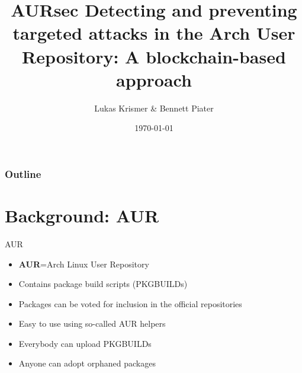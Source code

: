\documentclass{beamer}
\title{AURsec \newline Detecting and preventing targeted attacks in the Arch User Repository: A blockchain-based approach}
\author{Lukas Krismer \& Bennett Piater}
\institute{Universität Innsbruck - QE - Christian Sillaber}
\date{\today}
\begin{document}
\maketitle


\begin{frame}
	\frametitle{Outline}
	\tableofcontents
\end{frame}




\section{Background: AUR}

\begin{frame}{AUR}
	\pause
	\begin{itemize}
		\item \textbf{AUR}=\alert{A}rch Linux \alert{U}ser \alert{R}epository
		\item Contains package build scripts (PKGBUILDs)
		\item Packages can be voted for inclusion in the official repositories
		\item Easy to use using so-called AUR helpers
		\item Everybody can upload PKGBUILDs
		\item Anyone can adopt orphaned packages
	\end{itemize}
\end{frame}
\end{document}
